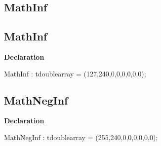 \documentclass{report}
\newif\ifpdf
\begin{document}
\subsection*{\large{\textbf{MathInf}}\normalsize\hspace{1ex}\hrulefill}
\else
\subsection*{MathInf}
\fi
\label{ok_if_directive-MathInf}
\begin{list}{}{
\setlength{\itemindent}{0cm}
\setlength{\listparindent}{0cm}
\setlength{\leftmargin}{\evensidemargin}
\addtolength{\leftmargin}{\tmplength}
\settowidth{\labelsep}{X}
\addtolength{\leftmargin}{\labelsep}
\setlength{\labelwidth}{\tmplength}
}
\item[\textbf{Declaration}\hfill]
\ifpdf
\begin{flushleft}
\fi
\begin{ttfamily}
MathInf : tdoublearray = (127,240,0,0,0,0,0,0);\end{ttfamily}

\ifpdf
\end{flushleft}
\fi

\end{list}
\ifpdf
\subsection*{\large{\textbf{MathNegInf}}\normalsize\hspace{1ex}\hrulefill}
\else
\subsection*{MathNegInf}
\fi
\label{ok_if_directive-MathNegInf}
\begin{list}{}{
\setlength{\itemindent}{0cm}
\setlength{\listparindent}{0cm}
\setlength{\leftmargin}{\evensidemargin}
\addtolength{\leftmargin}{\tmplength}
\settowidth{\labelsep}{X}
\addtolength{\leftmargin}{\labelsep}
\setlength{\labelwidth}{\tmplength}
}
\item[\textbf{Declaration}\hfill]
\ifpdf
\begin{flushleft}
\fi
\begin{ttfamily}
MathNegInf : tdoublearray = (255,240,0,0,0,0,0,0);\end{ttfamily}

\ifpdf
\end{flushleft}
\fi

\end{list}
\ifpdf
\end{document}
